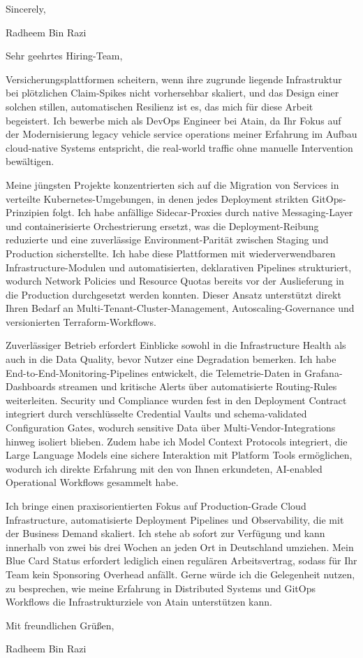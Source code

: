 \documentclass[11pt,a4paper]{coverletter}
\begin{document}
\closing{Sincerely,}{Radheem Bin Razi}

\clearpage
{}


\opening{Sehr geehrtes Hiring-Team,}

Versicherungsplattformen scheitern, wenn ihre zugrunde liegende Infrastruktur bei plötzlichen Claim-Spikes nicht vorhersehbar skaliert, und das Design einer solchen stillen, automatischen Resilienz ist es, das mich für diese Arbeit begeistert. Ich bewerbe mich als DevOps Engineer bei Atain, da Ihr Fokus auf der Modernisierung legacy vehicle service operations meiner Erfahrung im Aufbau cloud-native Systems entspricht, die real-world traffic ohne manuelle Intervention bewältigen.

Meine jüngsten Projekte konzentrierten sich auf die Migration von Services in verteilte Kubernetes-Umgebungen, in denen jedes Deployment strikten GitOps-Prinzipien folgt. Ich habe anfällige Sidecar-Proxies durch native Messaging-Layer und containerisierte Orchestrierung ersetzt, was die Deployment-Reibung reduzierte und eine zuverlässige Environment-Parität zwischen Staging und Production sicherstellte. Ich habe diese Plattformen mit wiederverwendbaren Infrastructure-Modulen und automatisierten, deklarativen Pipelines strukturiert, wodurch Network Policies und Resource Quotas bereits vor der Auslieferung in die Production durchgesetzt werden konnten. Dieser Ansatz unterstützt direkt Ihren Bedarf an Multi-Tenant-Cluster-Management, Autoscaling-Governance und versionierten Terraform-Workflows.

Zuverlässiger Betrieb erfordert Einblicke sowohl in die Infrastructure Health als auch in die Data Quality, bevor Nutzer eine Degradation bemerken. Ich habe End-to-End-Monitoring-Pipelines entwickelt, die Telemetrie-Daten in Grafana-Dashboards streamen und kritische Alerts über automatisierte Routing-Rules weiterleiten. Security und Compliance wurden fest in den Deployment Contract integriert durch verschlüsselte Credential Vaults und schema-validated Configuration Gates, wodurch sensitive Data über Multi-Vendor-Integrations hinweg isoliert blieben. Zudem habe ich Model Context Protocols integriert, die Large Language Models eine sichere Interaktion mit Platform Tools ermöglichen, wodurch ich direkte Erfahrung mit den von Ihnen erkundeten, AI-enabled Operational Workflows gesammelt habe.

Ich bringe einen praxisorientierten Fokus auf Production-Grade Cloud Infrastructure, automatisierte Deployment Pipelines und Observability, die mit der Business Demand skaliert. Ich stehe ab sofort zur Verfügung und kann innerhalb von zwei bis drei Wochen an jeden Ort in Deutschland umziehen. Mein Blue Card Status erfordert lediglich einen regulären Arbeitsvertrag, sodass für Ihr Team kein Sponsoring Overhead anfällt. Gerne würde ich die Gelegenheit nutzen, zu besprechen, wie meine Erfahrung in Distributed Systems und GitOps Workflows die Infrastrukturziele von Atain unterstützen kann.

\closing{Mit freundlichen Grüßen,}{Radheem Bin Razi}
\end{document}
